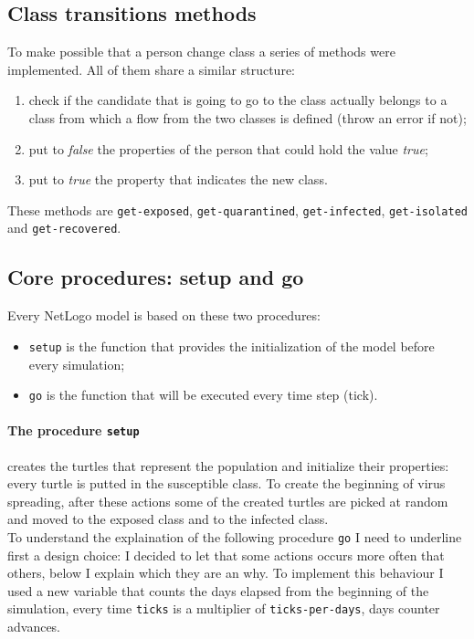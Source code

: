 \documentclass[12pt]{llncs}
\begin{document}
\subsection{Class transitions methods}
To make possible that a person change class a series of methods were implemented. All of them share a similar structure:
\begin{enumerate}
\item check if the candidate that is going to go to the class actually belongs to a class from which a flow from the two classes is defined (throw an error if not);
\item put to \textit{false} the properties of the person that could hold the value \textit{true};
\item put to \textit{true} the property that indicates the new class.
\end{enumerate}
These methods are \texttt{get-exposed}, \texttt{get-quarantined}, \texttt{get-infected}, \texttt{get-isolated} and \texttt{get-recovered}.

\subsection{Core procedures: setup and go}
Every NetLogo model is based on these two procedures:
\begin{itemize}
\item \texttt{setup} is the function that provides the initialization of the model before every simulation;
\item \texttt{go} is the function that will be executed every time step (tick).
\end{itemize}

\paragraph{The procedure \texttt{setup}} creates the turtles that represent the population and initialize their properties: every turtle is putted in the susceptible class. To create the beginning of virus spreading, after these actions some of the created turtles are picked at random and moved to the exposed class and to the infected class.\\

To understand the explaination of the following procedure \texttt{go} I need to underline first a design choice: I decided to let that some actions occurs more often that others, below I explain which they are an why. To implement this behaviour I used a new variable that counts the days elapsed from the beginning of the simulation, every time \texttt{ticks} is a multiplier of \texttt{ticks-per-days}, days counter advances.\\
\end{document}
